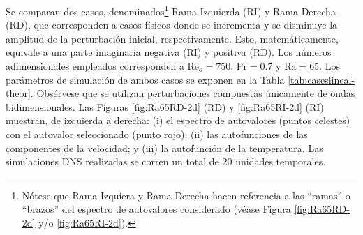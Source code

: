 Se comparan dos casos, denominados\footnote{Nótese que Rama Izquiera y Rama Derecha hacen referencia a las ``ramas'' o ``brazos'' del espectro de autovalores considerado (véase Figura \ref{fig:Ra65RD-2d} y/o \ref{fig:Ra65RI-2d}).} Rama Izquierda (RI) y Rama Derecha (RD), que corresponden a casos físicos donde se incrementa y se disminuye la amplitud de la perturbación inicial, respectivamente. Esto, matemáticamente, equivale a una parte imaginaria negativa (RI) y positiva (RD). Los números adimensionales empleados corresponden a $\text{Re}_o=750$, $\text{Pr}=0\text{.}7$ y $\text{Ra}=65$. Los parámetros de simulación de ambos casos se exponen en la \linebreak Tabla \ref{tab:caseslineal-theor}. Obsérvese que se utilizan perturbaciones compuestas únicamente de ondas bidimensionales. Las Figuras \ref{fig:Ra65RD-2d} (RD) y \ref{fig:Ra65RI-2d} (RI) muestran, de izquierda a derecha: (i) el espectro de autovalores (puntos celestes) con el autovalor seleccionado (punto rojo); (ii) las autofunciones de las componentes de la velocidad; y (iii) la autofunción de la temperatura. Las simulaciones DNS realizadas se corren un total de 20 unidades temporales.

\begin{table}[H]
\centering
{}
\caption{Parámetros de simulación de los dos casos elegidos.}
\label{tab:caseslineal-theor}
\end{table}

